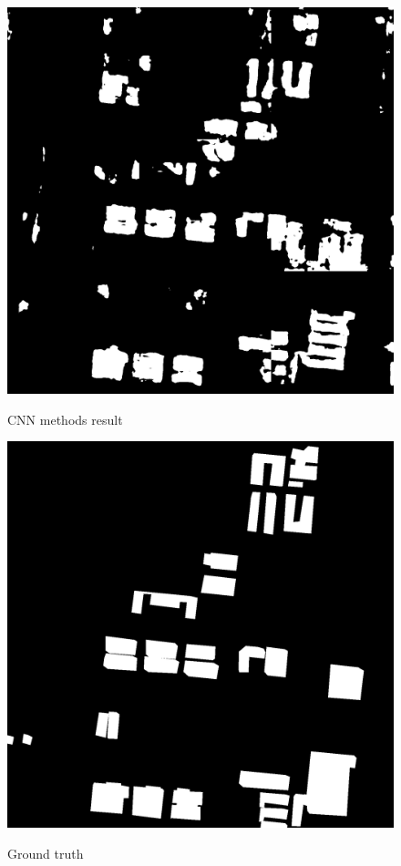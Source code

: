 \documentclass[]{IEEEtran}
\begin{document}
\newpage
\begin{figure}[!hbt]
		\vspace{0.7cm}
		\begin{center}
			\includegraphics[width=0.7\columnwidth]{fw}
			\caption{CNN methods result}
			\label{fig:fw}
		    \vspace{0.2cm}
			\includegraphics[width=0.7\columnwidth]{rs}
			\caption{Ground truth}
			\label{fig:rt}
		\end{center}
	\end{figure}
\end{document}
